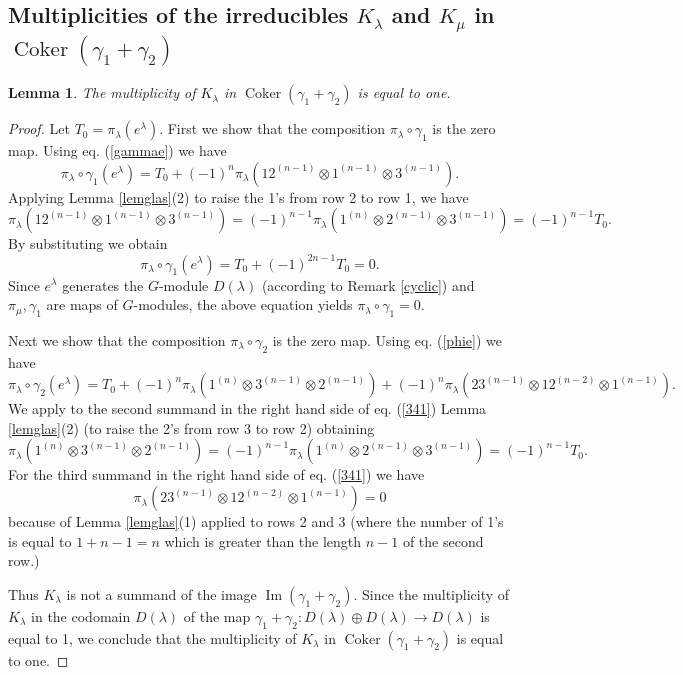 \documentclass[11pt]{amsart}
\newtheorem{lem}[thm]{Lemma}
\theoremstyle{definition}
\numberwithin{equation}{section}
\DeclareMathOperator{\Ima}{Im}
\DeclareMathOperator{\coker}{Coker}
\begin{document}
\subsection*{Multiplicities of the irreducibles $K_\lambda$ and $K_{\mu}$ in $\coker(\gamma_1+\gamma_2)$}
\begin{lem}\label{lemma1} The multiplicity of $K_{\lambda}$ in $\coker{(\gamma_1 + \gamma_2)}$ is equal to one.
\end{lem}
\begin{proof}
	Let $T_0=\pi_{\lambda}(e^{\lambda})$. First we show that the composition $\pi_{\lambda} \circ \gamma_1$ is the zero map. Using eq. (\ref{gammae}) we have \[\pi_{\lambda} \circ \gamma_1(e^{\lambda})=T_0+(-1)^n\pi_{\lambda}(12^{(n-1)} \otimes 1^{(n-1)} \otimes 3^{(n-1)}).\] Applying Lemma \ref{lemglas}(2) to raise the 1's from row 2 to row 1, we have \[\pi_{\lambda}(12^{(n-1)} \otimes 1^{(n-1)} \otimes 3^{(n-1)})=(-1)^{n-1}\pi_{\lambda}(1^{(n)} \otimes 2^{(n-1)} \otimes 3^{(n-1)})=(-1)^{n-1}T_0.\] By substituting we obtain \[\pi_{\lambda} \circ \gamma_1(e^{\lambda}) = T_0 +(-1)^{2n-1}T_0=0.\]
	Since $e^\lambda$ generates the $G$-module $D(\lambda)$ (according to Remark \ref{cyclic}) and $\pi_\mu, \gamma_1$ are maps of $G$-modules, the above equation yields $\pi_{\lambda} \circ \gamma_1=0$.
	
	Next we show that the composition $\pi_{\lambda} \circ \gamma_2$ is the zero map. Using eq. (\ref{phie}) we have \begin{equation}\label{341}\pi_{\lambda} \circ \gamma_2(e^{\lambda})=T_0+(-1)^n\pi_{\lambda}(1^{(n)} \otimes 3^{(n-1)} \otimes 2^{(n-1)}) +  (-1)^n\pi_{\lambda}(23^{(n-1)} \otimes 12^{(n-2)} \otimes 1^{(n-1)}).\end{equation}
	We apply to the second summand in the right hand side of eq. (\ref{341}) Lemma \ref{lemglas}(2) (to raise the 2's from row 3 to row 2) obtaining
	\[\pi_{\lambda}(1^{(n)} \otimes 3^{(n-1)} \otimes 2^{(n-1)})= (-1)^{n-1}\pi_{\lambda}(1^{(n)} \otimes 2^{(n-1)} \otimes 3^{(n-1)})=(-1)^{n-1}T_0.\]
	For the third summand in the right hand side of eq. (\ref{341}) we have \[\pi_{\lambda}(23^{(n-1)} \otimes 12^{(n-2)} \otimes 1^{(n-1)})=0\]
because of Lemma \ref{lemglas}(1) applied to rows 2 and 3 (where the number of 1's is equal to $1+n-1 = n$ which is greater than the length $n-1$ of the second row.)

 Thus $K_{\lambda}$ is not a summand of the image $\Ima(\gamma_1 + \gamma_2)$. Since  the multiplicity of $K_{\lambda}$ in the codomain $D({\lambda})$ of the map $\gamma_1 +\gamma_2 : D(\lambda) \oplus D(\lambda) \to D(\lambda)$ is equal to 1, we conclude that the multiplicity of $K_{\lambda}$ in $\coker{(\gamma_1 + \gamma_2)}$ is equal to one.
\end{proof}
\end{document}
